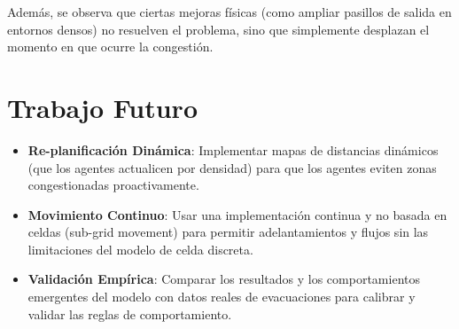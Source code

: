 \documentclass[11pt,spanish,listoffigures,listoftables]{tfgetsinf}
\begin{document}
Además, se observa que ciertas mejoras físicas (como ampliar pasillos de salida en entornos densos) no resuelven el problema, sino que simplemente desplazan el momento en que ocurre la congestión.

\section{Trabajo Futuro}
\begin{itemize}
    \item \textbf{Re-planificación Dinámica}: Implementar mapas de distancias dinámicos (que los agentes actualicen por densidad) para que los agentes eviten zonas congestionadas proactivamente.
    \item \textbf{Movimiento Continuo}: Usar una implementación continua y no basada en celdas (sub-grid movement) para permitir adelantamientos y flujos sin las limitaciones del modelo de celda discreta.
    \item \textbf{Validación Empírica}: Comparar los resultados y los comportamientos emergentes del modelo con datos reales de evacuaciones para calibrar y validar las reglas de comportamiento.
\end{itemize}
\cleardoublepage
\printbibliography





\end{document}
